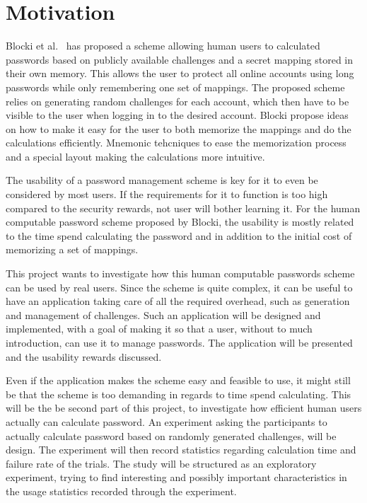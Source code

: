 \section{Motivation}
Blocki et al.~\cite{Blocki2014,hcp-blocki} has proposed a scheme allowing human users to calculated passwords based on publicly available challenges and a secret mapping stored in their own memory. This allows the user to protect all online accounts using long passwords while only remembering one set of mappings. The proposed scheme relies on generating random challenges for each account, which then have to be visible to the user when logging in to the desired account. Blocki propose ideas on how to make it easy for the user to both memorize the mappings and do the calculations efficiently. Mnemonic tehcniques to ease the memorization process and a special layout making the calculations more intuitive.
\par The usability of a password management scheme is key for it to even be considered by most users. If the requirements for it to function is too high compared to the security rewards, not user will bother learning it. For the human computable password scheme proposed by Blocki, the usability is mostly related to the time spend calculating the password and in addition to the initial cost of memorizing a set of mappings.
\par This project wants to investigate how this human computable passwords scheme can be used by real users. Since the scheme is quite complex, it can be useful to have an application taking care of all the required overhead, such as generation and management of challenges. Such an application will be designed and implemented, with a goal of making it so that a user, without to much introduction, can use it to manage passwords. The application will be presented and the usability rewards discussed.
\par Even if the application makes the scheme easy and feasible to use, it might still be that the scheme is too demanding in regards to time spend calculating. This will be the be second part of this project, to investigate how efficient human users actually can calculate password. An experiment asking the participants to actually calculate password based on randomly generated challenges, will be design. The experiment will then record statistics regarding calculation time and failure rate of the trials. The study will be structured as an exploratory experiment, trying to find interesting and possibly important characteristics in the usage statistics recorded through the experiment.

